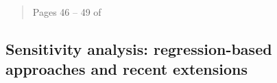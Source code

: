 \documentclass[12pt]{article}
\begin{document}
\begin{verse}  \end{verse}

\begin{verse}  \end{verse}

\begin{verse}  \end{verse}

\begin{verse}  \end{verse}

\begin{verse}  \end{verse}

\begin{verse}  \end{verse}

\begin{verse}  \end{verse}

\begin{verse} Pages 46 -- 49 of  \end{verse}

\subsection{Sensitivity analysis: regression-based approaches and recent extensions}

\begin{verse}  \end{verse}

\begin{verse}  \end{verse}

\begin{verse}  \end{verse}

\begin{verse}  \end{verse}

\begin{verse}  \end{verse}

\begin{verse}  \end{verse}
\end{document}
